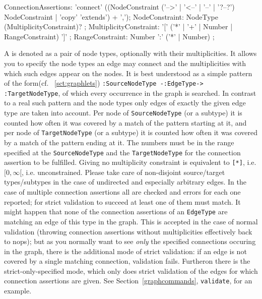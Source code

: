\begin{rail}  
  ConnectionAssertions: 'connect' ((NodeConstraint ('-->' | '<--' | '--' | '?--?') NodeConstraint | 'copy' 'extends') + ',');
  NodeConstraint: NodeType (MultiplicityConstraint)? ;
  MultiplicityConstraint: '[' ('*' | '+' | Number | RangeConstraint) ']' ;
  RangeConstraint: Number ':' ('*' | Number) ;
\end{rail}\label{sct:ConnectionAssertions}
A \emph{} is denoted as a pair of node types, optionally with their multiplicities. 
It allows you to specify the node types an edge may connect and the multiplicities with which such edges appear on the nodes.
It is best understood as a simple pattern of the form(cf. ~\ref{sct:graphlets}) \texttt{:SourceNodeType -:EdgeType-> :TargetNodeType}, of which every occurrence in the graph is searched.
In contrast to a real such pattern and the node types only edges of exactly the given edge type are taken into account.
Per node of \texttt{SourceNodeType} (or a subtype) it is counted how often it was covered by a match of the pattern starting at it,
and per node of \texttt{TargetNodeType} (or a subtype) it is counted how often it was covered by a match of the pattern ending at it.
The numbers must be in the range specified at the \texttt{SourceNodeType} and the \texttt{TargetNodeType} for the connection assertion to be fulfilled.
Giving no multiplicity constraint is equivalent to \verb#[*]#, i.e. $[0,\infty[$, i.e. unconstrained.
Please take care of non-disjoint source/target types/subtypes in the case of undirected and especially arbitrary edges.
In the case of multiple connection assertions all are checked and errors for each one reported; for strict validation to succeed at least one of them must match. 
It might happen that none of the connection assertions of an \texttt{EdgeType} are matching an edge of this type in the graph.
This is accepted in the case of normal validation (throwing connection assertions without multiplicities effectively back to nops); 
but as you normally want to see \emph{only} the specified connections occuring in the graph,
there is the additional mode of strict validation: if an edge is not covered by a single matching connection, validation fails.
Furtheron there is the strict-only-specified mode, which only does strict validation of the edges for which connection assertions are given.
See Section~\ref{graphcommands}, \texttt{validate}, for an example.

